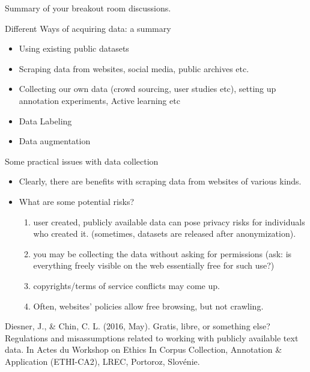 \documentclass{beamer}
\begin{document}
\begin{frame}{}
Summary of your breakout room discussions.
\end{frame}

\begin{frame}{Different Ways of acquiring data: a summary}
    \begin{itemize}
        \item Using existing public datasets
        \item Scraping data from websites, social media, public archives etc.
        \item Collecting our own data (crowd sourcing, user studies etc), setting up annotation experiments, Active learning etc
        \item Data Labeling
        \item Data augmentation
    \end{itemize}
\end{frame}

\begin{frame}{Some practical issues with data collection}
\begin{itemize}
    \item Clearly, there are benefits with scraping data from websites of various kinds.
    \item What are some potential risks? \pause
    \begin{enumerate}
        \item user created, publicly available data can pose privacy risks for individuals who created it. \pause (sometimes, datasets are released after anonymization).
        \item you may be collecting the data without asking for permissions (ask: is everything freely visible on the web essentially free for such use?)
        \item copyrights/terms of service conflicts may come up. \pause
        \item Often, websites' policies allow free browsing, but not crawling. 
    \end{enumerate}
\end{itemize}

\tiny Diesner, J., \& Chin, C. L. (2016, May). Gratis, libre, or something else? Regulations and misassumptions related to working with publicly available text data. In Actes du Workshop on Ethics In Corpus Collection, Annotation \& Application (ETHI-CA2), LREC, Portoroz, Slovénie.
\end{frame}
\end{document}
